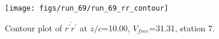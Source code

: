 \begin{figure}[H]
\centering
\texttt{[image: figs/run\_69/run\_69\_rr\_contour]}
\caption{Contour plot of $\overline{r^\prime r^\prime}$ at $z/c$=10.00, $V_{free}$=31.31, station 7.}
\end{figure}


